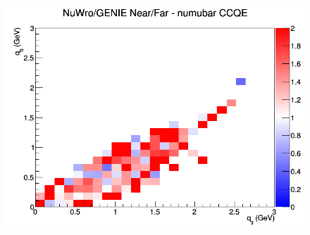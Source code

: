 \documentclass[12pt]{article}
\begin{document}
\begin{figure}[h]
\endminipage
{}
\includegraphics[width=\linewidth]{eff_q0_q3/FGT/ratios/CCQE_NuWro_GENIE_numubar_NF_q3_q0.png}
\endminipage
\newline
\end{figure}
\clearpage
\end{document}
